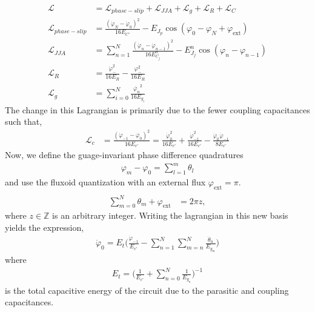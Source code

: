 \documentclass[%
reprint,
superscriptaddress,
 amsmath,amssymb,
 aps,
 prx,
longbibliography,
floatfix,
]{revtex4-2}
\begin{document}
\begin{align}
    \mathcal{L}&=\mathcal{L}_{phase-slip}+\mathcal{L}_{JJA}+\mathcal{L}_{g}+\mathcal{L}_{R}+\mathcal{L}_{C}\\
    \mathcal{L}_{phase-slip}&=\frac{(\dot{\varphi}_N-\dot{\varphi}_0)^2}{16E_{C'}}-E_{J_p}\cos(\varphi_0-\varphi_{N}+\varphi_\mathrm{ext})\\
    \mathcal{L}_{JJA}&=\sum_{n=1}^N\frac{(\dot{\varphi}_n-\dot{\varphi}_{n-1})^2}{16E^{n}_{C_j}}-E^{n}_{J_j}\cos(\varphi_n-\varphi_{n-1})\\
    \mathcal{L}_{R}&=\frac{\dot{\varphi}_{-}^2}{16E_{{R}}}-\frac{\varphi_{-}^2}{16E_{R}}\\
    \mathcal{L}_{g}&=\sum_{i=0}^{N} \frac{\dot{\varphi_n}^2}{16E_{g_i}}\label{eq:float-float}
  \end{align}
The change in this Lagrangian is primarily due to the fewer coupling capacitances such that,
\begin{align}
\mathcal{L}_{c}&=\frac{(\dot{\varphi}_{-1}-\dot{\varphi_0})^2}{16E_{c'}}=\frac{\dot{\varphi}^2_0}{16E_{c'}}+\frac{\dot{\varphi}^2_{-1}}{16E_{c'}}-\frac{\dot{\varphi}_0\dot{\varphi}_{-1}}{8E_{c'}}
\end{align}
Now, we define the guage-invariant phase difference quadratures 
\begin{align}
\varphi_m-\varphi_0=\sum_{l=1}^m\theta_l
\end{align}
and use the fluxoid quantization with an external flux $\varphi_{\mathrm{ext}}=\pi$.
\begin{align}
\\ \sum_{m=0}^N \theta_m+\varphi_\mathrm{ext}&=2\pi z,
\end{align}
where $z\in\mathbb{Z}$ is an arbitrary integer. Writing the lagrangian in this new basis yields the expression,
\begin{align}
    \dot{\varphi}_0=E_t\Big(\frac{\dot{\varphi}_{-1}}{E_{c'}}-\sum_{n=1}^N\sum_{m=n}^N\frac{\dot{\theta}_n}{E_{g_m}}\Big)
\end{align}
where 
\begin{align}
E_t=\Big(\frac{1}{E_{c'}}+\sum_{n=0}^N\frac{1}{E_{g_n}}\Big)^{-1}
\end{align}
is the total capacitive energy of the circuit due to the parasitic and coupling capacitances.
\end{document}
